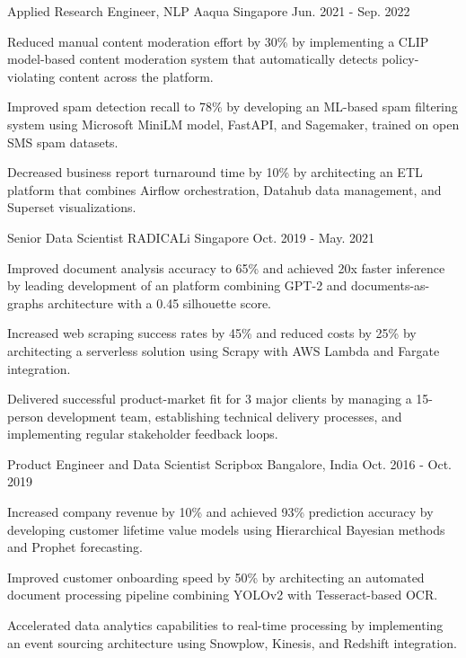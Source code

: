 \begin{cventries}
  \cventry
    {Applied Research Engineer, NLP} %
    {Aaqua} %
    {Singapore} %
    {Jun. 2021  - Sep. 2022} %
    {
      \begin{cvitems} %
        \item {Reduced manual content moderation effort by 30\% by implementing a CLIP model-based content moderation system that automatically detects policy-violating content across the platform.}
        \item {Improved spam detection recall to 78\% by developing an ML-based spam filtering system using Microsoft MiniLM model, FastAPI, and Sagemaker, trained on open SMS spam datasets.}
        \item {Decreased business report turnaround time by 10\% by architecting an ETL platform that combines Airflow orchestration, Datahub data management, and Superset visualizations.}
      \end{cvitems}
    }

  \cventry
    {Senior Data Scientist} %
    {RADICALi} %
    {Singapore} %
    {Oct. 2019 - May. 2021} %
    {
      \begin{cvitems} %
        \item {Improved document analysis accuracy to 65\% and achieved 20x faster inference by leading development of an platform combining GPT-2 and documents-as-graphs architecture with a 0.45 silhouette score.}
        \item{Increased web scraping success rates by 45\% and reduced costs by 25\% by architecting a serverless solution using Scrapy with AWS Lambda and Fargate integration.}
        \item{Delivered successful product-market fit for 3 major clients by managing a 15-person development team, establishing technical delivery processes, and implementing regular stakeholder feedback loops.}
      \end{cvitems}
    }
  \cventry
    {Product Engineer and Data Scientist} %
    {Scripbox} %
    {Bangalore, India} %
    {Oct. 2016 - Oct. 2019} %
    {
      \begin{cvitems} %
        \item {Increased company revenue by 10\% and achieved 93\% prediction accuracy by developing customer lifetime value models using Hierarchical Bayesian methods and Prophet forecasting.}
        \item{Improved customer onboarding speed by 50\% by architecting an automated document processing pipeline combining YOLOv2 with Tesseract-based OCR. }
        \item{Accelerated data analytics capabilities to real-time processing by implementing an event sourcing architecture using Snowplow, Kinesis, and Redshift integration.}
      \end{cvitems}
    }


\end{cventries}
